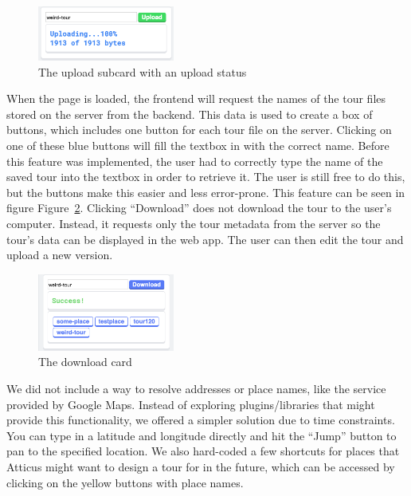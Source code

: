 \documentclass[a4paper, 10pt, american, titlepage]{article}
\begin{document}
\begin{figure}[h]
	\centering
    \includegraphics[width=0.4\textwidth]{uploading-message-editour.png}
    \caption{The upload subcard with an upload status}
	\label{fig:uploadingMessage}
\end{figure}

When the page is loaded, the frontend will request the names of the tour files
stored on the server from the backend. This data is used to create a box of
buttons, which includes one button for each tour file on the server. Clicking
on one of these blue buttons will fill the textbox in with the correct name.
Before this feature was implemented, the user had to correctly type the name of
the saved tour into the textbox in order to retrieve it. The user is still free
to do this, but the buttons make this easier and less error-prone. This feature
can be seen in figure Figure~\ref{fig:downloadCard}. Clicking ``Download'' does
not download the tour to the user's computer. Instead, it requests only the
tour metadata from the server so the tour's data can be displayed in the web
app. The user can then edit the tour and upload a new version.

\begin{figure}[h]
	\centering
    \includegraphics[width=0.4\textwidth]{download-card-editour.png}
    \caption{The download card}
	\label{fig:downloadCard}
\end{figure}

We did not include a way to resolve addresses or place names, like the service
provided by Google Maps. Instead of exploring plugins/libraries that might
provide this functionality, we offered a simpler solution due to time
constraints.  You can type in a latitude and longitude directly and hit the
``Jump'' button to pan to the specified location. We also hard-coded a few
shortcuts for places that Atticus might want to design a tour for in the future,
which can be accessed by clicking on the yellow buttons with place names.
\end{document}
